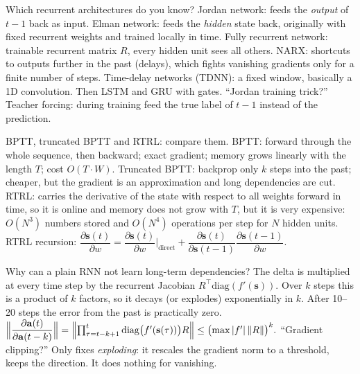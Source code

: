 \begin{qabox}[Hochreiter]{\cexam Which recurrent architectures do you know?}
\ans Jordan network: feeds the \emph{output} of $t-1$ back as input. Elman network: feeds the
\emph{hidden} state back, originally with fixed recurrent weights and trained locally in time.
Fully recurrent network: trainable recurrent matrix $R$, every hidden unit sees all others.
NARX: shortcuts to outputs further in the past (delays), which fights vanishing gradients only for a
finite number of steps. Time-delay networks (TDNN): a fixed window, basically a 1D convolution.
Then LSTM and GRU with gates.
\follow ``Jordan training trick?'' Teacher forcing: during training feed the true label of $t-1$
instead of the prediction.
\end{qabox}

\begin{qabox}[Hochreiter]{\cexam BPTT, truncated BPTT and RTRL: compare them.}
\ans BPTT: forward through the whole sequence, then backward; exact gradient; memory grows
linearly with the length $T$; cost $O(T\cdot W)$. Truncated BPTT: backprop only $k$ steps into
the past; cheaper, but the gradient is an approximation and long dependencies are cut. RTRL:
carries the derivative of the state with respect to all weights forward in time, so it is online
and memory does not grow with $T$, but it is very expensive: $O(N^3)$ numbers stored and $O(N^4)$
operations per step for $N$ hidden units.
\formula RTRL recursion:
$\dfrac{\partial\mathbf{s}(t)}{\partial w}=\dfrac{\partial\mathbf{s}(t)}{\partial w}\Big|_{\text{direct}}
+\dfrac{\partial\mathbf{s}(t)}{\partial\mathbf{s}(t-1)}\dfrac{\partial\mathbf{s}(t-1)}{\partial w}$.
\end{qabox}

\begin{qabox}[Hochreiter]{\cexam Why can a plain RNN not learn long-term dependencies?}
\ans The delta is multiplied at every time step by the recurrent Jacobian
$R^\top\mathrm{diag}(f'(\mathbf{s}))$. Over $k$ steps this is a product of $k$ factors, so it
decays (or explodes) exponentially in $k$. After 10--20 steps the error from the past is
practically zero.
\formula
$\Bigl\lVert\dfrac{\partial\mathbf{a}(t)}{\partial\mathbf{a}(t-k)}\Bigr\rVert
=\Bigl\lVert\prod_{\tau=t-k+1}^{t}\mathrm{diag}\bigl(f'(\mathbf{s}(\tau))\bigr)R\Bigr\rVert
\le\bigl(\max|f'|\,\lVert R\rVert\bigr)^{k}.$
\follow ``Gradient clipping?'' Only fixes \emph{exploding}: it rescales the gradient norm to a
threshold, keeps the direction. It does nothing for vanishing.
\end{qabox}

